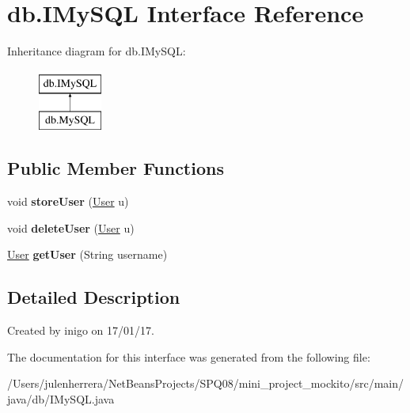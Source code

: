 \hypertarget{interfacedb_1_1_i_my_s_q_l}{}\section{db.\+I\+My\+S\+QL Interface Reference}
\label{interfacedb_1_1_i_my_s_q_l}
Inheritance diagram for db.\+I\+My\+S\+QL\+:\begin{figure}[H]
\begin{center}
\leavevmode
\includegraphics[height=2.000000cm]{interfacedb_1_1_i_my_s_q_l}
\end{center}
\end{figure}
\subsection*{Public Member Functions}
\begin{DoxyCompactItemize}
\item 
\mbox{\label{interfacedb_1_1_i_my_s_q_l_a5d5f31742f4ae37236eb23ba9a073b6c}} 
void {\bfseries store\+User} (\hyperlink{classentities_1_1_user}{User} u)
\item 
\mbox{\label{interfacedb_1_1_i_my_s_q_l_af0e64e1a6501d5a9a397e048ef97ea35}} 
void {\bfseries delete\+User} (\hyperlink{classentities_1_1_user}{User} u)
\item 
\mbox{\label{interfacedb_1_1_i_my_s_q_l_ad791cc64c769d9c29d7ad2650f9213dd}} 
\hyperlink{classentities_1_1_user}{User} {\bfseries get\+User} (String username)
\end{DoxyCompactItemize}


\subsection{Detailed Description}
Created by inigo on 17/01/17. 

The documentation for this interface was generated from the following file\+:\begin{DoxyCompactItemize}
\item 
/\+Users/julenherrera/\+Net\+Beans\+Projects/\+S\+P\+Q08/mini\+\_\+project\+\_\+mockito/src/main/java/db/I\+My\+S\+Q\+L.\+java\end{DoxyCompactItemize}
